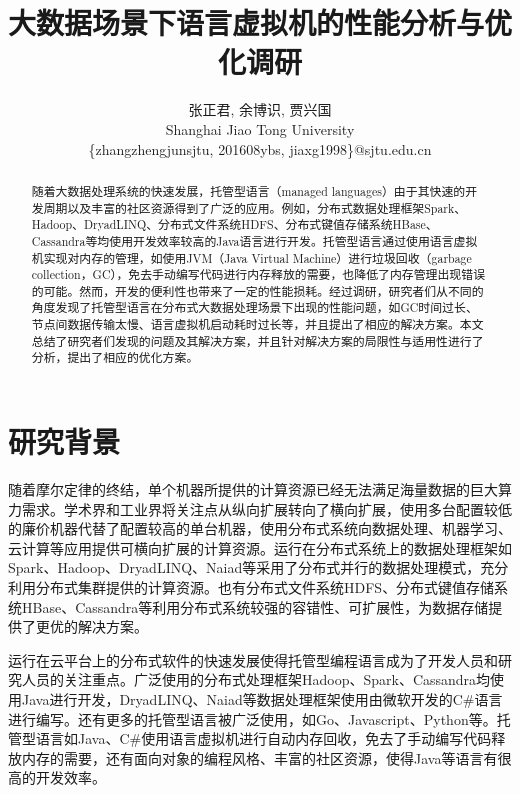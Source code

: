 \documentclass[lang=cn,11pt,a4paper,cite=authoryear]{elegantpaper}
\title{大数据场景下语言虚拟机的性能分析与优化调研}
\author{张正君, 余博识, 贾兴国 \\ Shanghai Jiao Tong University \\ \{zhangzhengjunsjtu, 201608ybs, jiaxg1998\}@sjtu.edu.cn}
\institute{\href{http://www.se.sjtu.edu.cn/}{School of Software Engineering}}
\date{\zhtoday}
\begin{document}
\maketitle

\begin{abstract}
随着大数据处理系统的快速发展，托管型语言（managed languages）由于其快速的开发周期以及丰富的社区资源得到了广泛的应用。例如，分布式数据处理框架Spark、Hadoop、DryadLINQ、分布式文件系统HDFS、分布式键值存储系统HBase、Cassandra等均使用开发效率较高的Java语言进行开发。托管型语言通过使用语言虚拟机实现对内存的管理，如使用JVM（Java Virtual Machine）进行垃圾回收（garbage collection，GC），免去手动编写代码进行内存释放的需要，也降低了内存管理出现错误的可能。然而，开发的便利性也带来了一定的性能损耗。经过调研，研究者们从不同的角度发现了托管型语言在分布式大数据处理场景下出现的性能问题，如GC时间过长、节点间数据传输太慢、语言虚拟机启动耗时过长等，并且提出了相应的解决方案。本文总结了研究者们发现的问题及其解决方案，并且针对解决方案的局限性与适用性进行了分析，提出了相应的优化方案。
\end{abstract}

\cleardoublepage
\tableofcontents
\cleardoublepage

\section{研究背景}
随着摩尔定律的终结，单个机器所提供的计算资源已经无法满足海量数据的巨大算力需求。学术界和工业界将关注点从纵向扩展转向了横向扩展，使用多台配置较低的廉价机器代替了配置较高的单台机器，使用分布式系统向数据处理、机器学习、云计算等应用提供可横向扩展的计算资源。运行在分布式系统上的数据处理框架如Spark\cite{spark}、Hadoop\cite{hadoop}、DryadLINQ\cite{DBLP:conf/osdi/YuIFBEGC08}、Naiad\cite{DBLP:conf/sosp/MurrayMIIBA13}等采用了分布式并行的数据处理模式，充分利用分布式集群提供的计算资源。也有分布式文件系统HDFS\cite{hdfs}、分布式键值存储系统HBase\cite{hbase}、Cassandra\cite{cassandra}等利用分布式系统较强的容错性、可扩展性，为数据存储提供了更优的解决方案。

运行在云平台上的分布式软件的快速发展使得托管型编程语言成为了开发人员和研究人员的关注重点。广泛使用的分布式处理框架Hadoop、Spark、Cassandra均使用Java进行开发，DryadLINQ、Naiad等数据处理框架使用由微软开发的C\#语言进行编写。还有更多的托管型语言被广泛使用，如Go、Javascript、Python等。托管型语言如Java、C\#使用语言虚拟机进行自动内存回收，免去了手动编写代码释放内存的需要，还有面向对象的编程风格、丰富的社区资源，使得Java等语言有很高的开发效率。
\end{document}
